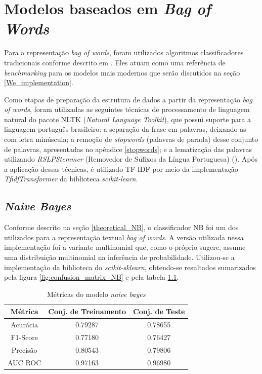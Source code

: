 \chapter{Modelos baseados em \textit{Bag of Words}} \label{bow_implementation}

Para a representação \textit{bag of words}, foram utilizados algoritmos classificadores tradicionais conforme descrito em \cite{InformationRetrievalBook}. Eles atuam como uma referência de \textit{benchmarking} para os modelos mais modernos que serão discutidos na seção \ref{We_implementation}.

Como etapas de preparação da estrutura de dados a partir da representação \textit{bag of words}, foram utilizadas as seguintes técnicas de processamento de linguagem natural do pacote NLTK (\textit{Natural Language Toolkit}), que possui suporte para a linguagem português brasileiro: a separação da frase em palavras, deixando-as com letra minúscula; a remoção de \textit{stopwords} (palavras de parada) desse conjunto de palavras, apresentadas no apêndice \ref{stopwords}; e a lematização das palavras utilizando \textit{RSLPStemmer} (Removedor de Sufixos da Língua Portuguesa) (\cite{RSLPStemmer}). Após a aplicação dessas técnicas, é utilizado TF-IDF por meio da implementação \textit{TfidfTransformer} da biblioteca \textit{scikit-learn}.

\section{\textit{Naive Bayes}}

Conforme descrito na seção \ref{theoretical_NB}, o classificador NB foi um dos utilizados para a representação textual \textit{bag of words}. A versão utilizada nessa implementação foi a variante multinomial que, como o próprio sugere, assume uma distribuição multinomial na inferência de probabilidade. Utilizou-se a implementação da biblioteca do \textit{scikit-sklearn}, obtendo-se resultados sumarizados pela figura \ref{fig:confusion_matrix_NB} e pela tabela \ref{tab:NB}.

\begin{table}[ht]
\centering
\caption{Métricas do modelo \textit{naive bayes}}
\vspace{0.5cm}
\begin{tabular}{c|c|c}
 
Métrica & Conj. de Treinamento & Conj. de Teste \\
\hline
Acurácia & 0.79287 & 0.78655 \\
F1-Score & 0.77180 & 0.76427 \\
Precisão & 0.80543 & 0.79806 \\
AUC ROC  & 0.97163 & 0.96980
\end{tabular}
\label{tab:NB}
\end{table}

